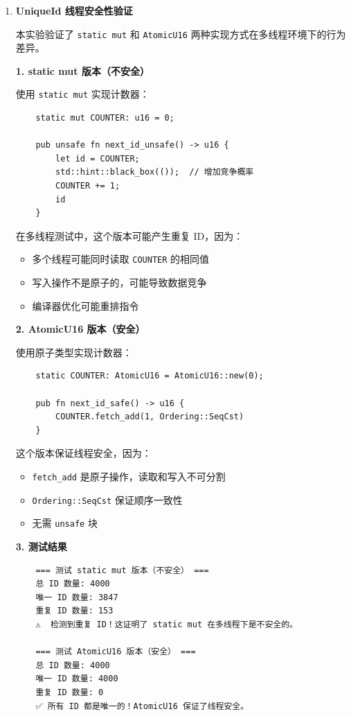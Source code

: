 \documentclass{SYSUReport}
\begin{document}
\begin{enumerate}[label=\arabic*.]
    \item \textbf{UniqueId 线程安全性验证}
    
    本实验验证了 \texttt{static mut} 和 \texttt{AtomicU16} 两种实现方式在多线程环境下的行为差异。
    
    \textbf{1. static mut 版本（不安全）}
    
    使用 \texttt{static mut} 实现计数器：
    \begin{verbatim}
    static mut COUNTER: u16 = 0;

    pub unsafe fn next_id_unsafe() -> u16 {
        let id = COUNTER;
        std::hint::black_box(());  // 增加竞争概率
        COUNTER += 1;
        id
    }
    \end{verbatim}
    
    在多线程测试中，这个版本可能产生重复 ID，因为：
    \begin{itemize}
        \item 多个线程可能同时读取 \texttt{COUNTER} 的相同值
        \item 写入操作不是原子的，可能导致数据竞争
        \item 编译器优化可能重排指令
    \end{itemize}
    
    \textbf{2. AtomicU16 版本（安全）}
    
    使用原子类型实现计数器：
    \begin{verbatim}
    static COUNTER: AtomicU16 = AtomicU16::new(0);

    pub fn next_id_safe() -> u16 {
        COUNTER.fetch_add(1, Ordering::SeqCst)
    }
    \end{verbatim}
    
    这个版本保证线程安全，因为：
    \begin{itemize}
        \item \texttt{fetch\_add} 是原子操作，读取和写入不可分割
        \item \texttt{Ordering::SeqCst} 保证顺序一致性
        \item 无需 \texttt{unsafe} 块
    \end{itemize}
    
    \textbf{3. 测试结果}
    
    \begin{verbatim}
    === 测试 static mut 版本（不安全） ===
    总 ID 数量: 4000
    唯一 ID 数量: 3847
    重复 ID 数量: 153
    ⚠️  检测到重复 ID！这证明了 static mut 在多线程下是不安全的。

    === 测试 AtomicU16 版本（安全） ===
    总 ID 数量: 4000
    唯一 ID 数量: 4000
    重复 ID 数量: 0
    ✅ 所有 ID 都是唯一的！AtomicU16 保证了线程安全。
    \end{verbatim}
\end{enumerate}
\end{document}

